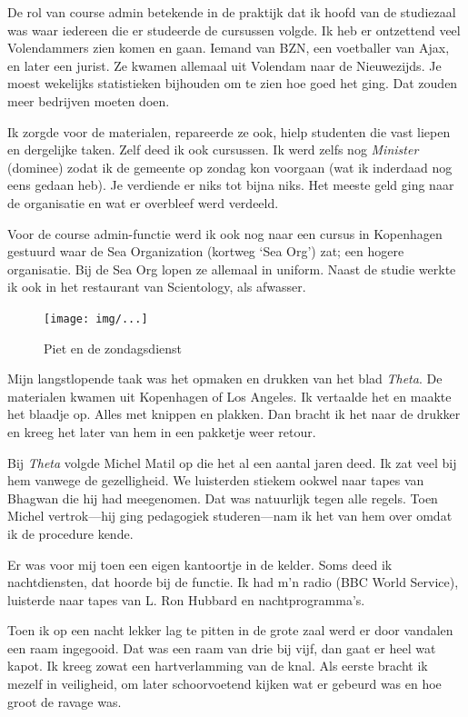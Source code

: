 \documentclass[12pt,twoside, openright]{memoir}
\begin{document}
De rol van course admin betekende in de praktijk dat ik hoofd van de studiezaal was waar iedereen die er studeerde de cursussen volgde. Ik heb er ontzettend veel Volendammers zien komen en gaan. Iemand van BZN, een voetballer van Ajax, en later een jurist. Ze kwamen allemaal uit Volendam naar de Nieuwezijds. Je moest wekelijks statistieken bijhouden om te zien hoe goed het ging. Dat zouden meer bedrijven moeten doen.

Ik zorgde voor de materialen, repareerde ze ook, hielp studenten die vast liepen en dergelijke taken. Zelf deed ik ook cursussen. Ik werd zelfs nog \emph{Minister} (dominee) zodat ik de gemeente op zondag kon voorgaan (wat ik inderdaad nog eens gedaan heb). Je verdiende er niks tot bijna niks. Het meeste geld ging naar de organisatie en wat er overbleef werd verdeeld. 

Voor de course admin-functie werd ik ook nog naar een cursus in Kopenhagen gestuurd waar de Sea Organization (kortweg `Sea Org') zat; een hogere organisatie. Bij de Sea Org lopen ze allemaal in uniform. Naast de studie werkte ik ook in het restaurant van Scientology, als afwasser.

\begin{figure}[t]
\texttt{[image: img/...]}
\caption{Piet en de zondagsdienst}
\end{figure}

Mijn langstlopende taak was het opmaken en drukken van het blad \emph{Theta}. De materialen kwamen uit Kopenhagen of Los Angeles. Ik vertaalde het en maakte het blaadje op. Alles met knippen en plakken. Dan bracht ik het naar de drukker en kreeg het later van hem in een pakketje weer retour. 

Bij \emph{Theta} volgde Michel Matil op die het al een aantal jaren deed. Ik zat veel bij hem vanwege de gezelligheid. We luisterden stiekem ookwel naar tapes van Bhagwan die hij had meegenomen. Dat was natuurlijk tegen alle regels. Toen Michel vertrok---hij ging pedagogiek studeren---nam ik het van hem over omdat ik de procedure kende. 

Er was voor mij toen een eigen kantoortje in de kelder. Soms deed ik nachtdiensten, dat hoorde bij de functie. Ik had m’n radio (BBC World Service), luisterde naar tapes van L. Ron Hubbard en nachtprogramma’s. 

Toen ik op een nacht lekker lag te pitten in de grote zaal werd er door vandalen een raam ingegooid. Dat was een raam van drie bij vijf, dan gaat er heel wat kapot. Ik kreeg zowat een hartverlamming van de knal. Als eerste bracht ik mezelf in veiligheid, om later schoorvoetend kijken wat er gebeurd was en hoe groot de ravage was.
\end{document}

